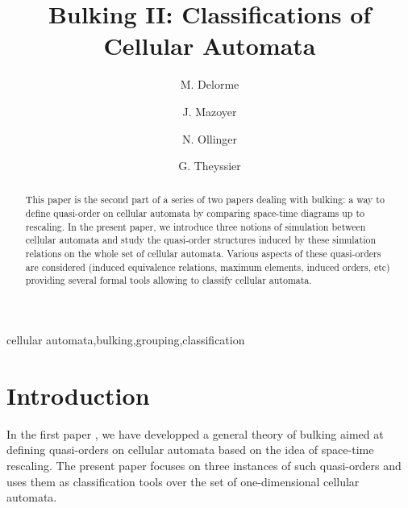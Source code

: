 \documentclass[a4paper]{elsarticle}
\begin{document}
\begin{frontmatter}
  \title{Bulking II: Classifications of Cellular Automata}
  \author[lip]{M. Delorme}
  \author[lip]{J. Mazoyer}
  \author[lif]{N. Ollinger}
  \author[lama]{G. Theyssier} 

  \address[lip]{LIP, ENS Lyon, CNRS, 46 all\'ee d'Italie,
    69\hspace{0.2em}007 Lyon, France} \address[lif]{LIF, Aix-Marseille
    Universit\'e, CNRS, 39 rue Joliot-Curie, 13\hspace{0.2em}013
    Marseille, } \address[lama]{LAMA, Universit\'e de
    Savoie, CNRS, 73\hspace{0.2em}376 Le Bourget-du-Lac Cedex, France}

\begin{abstract}
  This paper is the second part of a series of two papers dealing with
  bulking: a way to define quasi-order on cellular automata by
  comparing space-time diagrams up to rescaling.  In the present
  paper, we introduce three notions of simulation between cellular
  automata and study the quasi-order structures induced by these
  simulation relations on the whole set of cellular automata. Various
  aspects of these quasi-orders are considered (induced equivalence
  relations, maximum elements, induced orders, etc) providing several
  formal tools allowing to classify cellular automata.
\end{abstract}

\begin{keyword}
cellular automata\sep bulking\sep grouping\sep classification
\end{keyword}
\end{frontmatter}

\section{Introduction}
\label{sec:intro}

In the first paper \cite{bulking1}, we have developped a general theory of
bulking aimed at defining quasi-orders on cellular automata based on the idea of
space-time rescaling. The present paper focuses on three instances of such
quasi-orders and uses them as classification tools over the set of
one-dimensional cellular automata.
\end{document}
